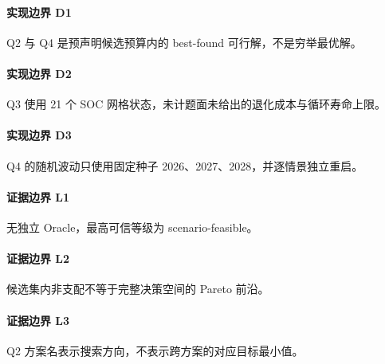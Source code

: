 \paragraph{实现边界 D1}Q2 与 Q4 是预声明候选预算内的 best-found 可行解，不是穷举最优解。
\paragraph{实现边界 D2}Q3 使用 21 个 SOC 网格状态，未计题面未给出的退化成本与循环寿命上限。
\paragraph{实现边界 D3}Q4 的随机波动只使用固定种子 2026、2027、2028，并逐情景独立重启。
\paragraph{证据边界 L1}无独立 Oracle，最高可信等级为 scenario-feasible。
\paragraph{证据边界 L2}候选集内非支配不等于完整决策空间的 Pareto 前沿。
\paragraph{证据边界 L3}Q2 方案名表示搜索方向，不表示跨方案的对应目标最小值。
